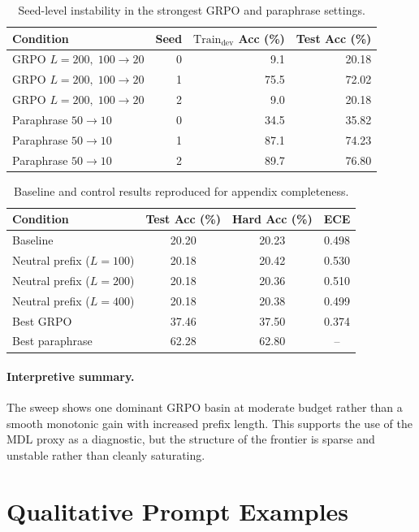 \documentclass[preprint]{article}
\newcommand{\Traindev}{\text{Train}_{\text{dev}}}
\begin{document}
\begin{table}[h]
\centering
\caption{Seed-level instability in the strongest GRPO and paraphrase settings.}
\label{tab:seed_instability}
\small
\begin{tabular}{lrrr}
\toprule
Condition & Seed & $\Traindev$ Acc (\%) & Test Acc (\%) \\
\midrule
GRPO $L{=}200,\;100{\to}20$ & 0 & 9.1 & 20.18 \\
GRPO $L{=}200,\;100{\to}20$ & 1 & 75.5 & 72.02 \\
GRPO $L{=}200,\;100{\to}20$ & 2 & 9.0 & 20.18 \\
Paraphrase $50{\to}10$ & 0 & 34.5 & 35.82 \\
Paraphrase $50{\to}10$ & 1 & 87.1 & 74.23 \\
Paraphrase $50{\to}10$ & 2 & 89.7 & 76.80 \\
\bottomrule
\end{tabular}
\end{table}

\begin{table}[h]
\centering
\caption{Baseline and control results reproduced for appendix completeness.}
\label{tab:appendix_controls}
\small
\begin{tabular}{lccc}
\toprule
Condition & Test Acc (\%) & Hard Acc (\%) & ECE \\
\midrule
Baseline & 20.20 & 20.23 & 0.498 \\
Neutral prefix ($L{=}100$) & 20.18 & 20.42 & 0.530 \\
Neutral prefix ($L{=}200$) & 20.18 & 20.36 & 0.510 \\
Neutral prefix ($L{=}400$) & 20.18 & 20.38 & 0.499 \\
Best GRPO & 37.46 & 37.50 & 0.374 \\
Best paraphrase & 62.28 & 62.80 & -- \\
\bottomrule
\end{tabular}
\end{table}

\paragraph{Interpretive summary.}
The sweep shows one dominant GRPO basin at moderate budget rather than a smooth monotonic gain with increased prefix length.
This supports the use of the MDL proxy as a diagnostic, but the structure of the frontier is sparse and unstable rather than cleanly saturating.

\section{Qualitative Prompt Examples}
\label{app:qualitative}
\end{document}
